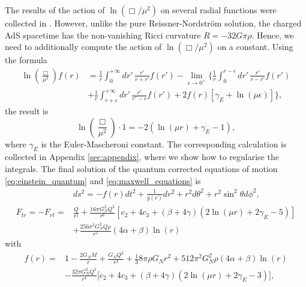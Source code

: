 \documentclass[10pt,a4paper]{article}
\begin{document}
The results of the action of $\ln\left(\Box/\mu^2\right)$ on several radial functions were collected in \cite{Delgado:2022pcc}. However, unlike the pure Reissner-Nordstr\"om solution, the charged AdS spacetime has the non-vanishing Ricci curvature $R=-32G\pi\rho$. Hence, we need to additionally compute the action of $\ln\left(\Box/\mu^2\right)$ on a constant. Using the formula \cite{Calmet:2019eof}
\begin{equation}\label{eq:formula_actionlog}
\begin{split}
    \ln\left(\frac{\Box}{\mu^2}\right)f(r)&=\frac{1}{r}\int_0^{+\infty}dr'\,\frac{r'}{r+r'}f(r')-\lim_{\epsilon\to 0^{+}}\bigg\{ \frac{1}{r}\int_0^{r-\epsilon}dr'\,\frac{r'}{r-r'}f(r')\\
    &+\frac{1}{r}\int_{r+\epsilon}^{+\infty}dr'\,\frac{r'}{r'-r}f(r')
    +2f(r)\left[\gamma_E+\ln\left(\mu\epsilon\right)\right]\bigg\},
\end{split}
\end{equation}
the result is
\begin{equation}
    \ln\left(\frac{\Box}{\mu^2}\right)\cdot 1=-2\left(\ln(\mu r) + \gamma_E -1 \right),
\end{equation}
where $\gamma_E$ is the Euler-Mascheroni constant.
The corresponding calculation is collected in Appendix \ref{sec:appendix}, where we show how to regularise the integrals.
The final solution of the quantum corrected equations of motion \eqref{eq:einstein_quantum} and \eqref{eq:maxwell_equations} is
\begin{equation}\label{eq:final_metric}
\begin{split}
    &ds^2=-f(r)dt^2+\frac{1}{g(r)}dr^2+r^2d\theta^2+r^2\sin^2\theta d\phi^2,\\
    F_{tr}=-F_{rt}=&\frac{Q}{r^2}+\frac{16\pi G^2_N Q^3}{r^6}\left[c_2+4c_3+\left(\beta+4\gamma\right)\left(2\ln\left(\mu r\right)+2\gamma_E-5\right)\right]\\
    &+\frac{256\pi^2G^2_NQ\rho}{r^2}(4\alpha+\beta)\ln(r)
\end{split}
\end{equation}
with
\begin{equation}
\begin{split}
    f(r)=&1-\frac{2G_N M}{r}+\frac{G_N Q^2}{r^2}+\frac{1}{3}8\pi\rho G_N r^2+512\pi^2G^2_N\rho(4\alpha+\beta)\ln(r)\\&-\frac{32\pi G^2_N Q^2}{r^4} \Big[c_2+4c_3+\left(\beta+4\gamma\right)\left(2\ln\left(\mu r\right)+2\gamma_E-3\right)\Big],
\end{split}
\end{equation}
\end{document}
